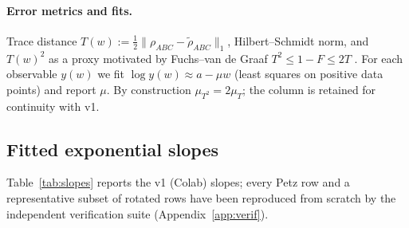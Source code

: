 \documentclass[11pt]{article}
\begin{document}
\paragraph{Error metrics and fits.}
Trace distance $T(w) := \frac12\|\rho_{ABC} - \tilde\rho_{ABC}\|_1$,
Hilbert--Schmidt norm, and $T(w)^2$ as a proxy motivated by Fuchs--van de
Graaf $T^2 \le 1 - F \le 2T$ \cite{NC}. For each observable $y(w)$ we fit
$\log y(w) \approx a - \mu w$ (least squares on positive data points) and
report $\mu$. By construction $\mu_{T^2} = 2\mu_T$; the column is retained
for continuity with v1.

\subsection{Fitted exponential slopes}

Table~\ref{tab:slopes} reports the v1 (Colab) slopes; every Petz row and a
representative subset of rotated rows have been reproduced from scratch by the
independent verification suite (Appendix~\ref{app:verif}).
\end{document}
